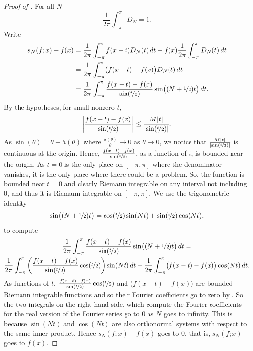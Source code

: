 \begin{proof}[Proof of ]
For all $N$,
\begin{equation*}
\frac{1}{2\pi} \int_{-\pi}^\pi D_N = 1 .
\end{equation*}
Write
\begin{equation*}
\begin{split}
s_N(f;x)-f(x) & =
\frac{1}{2\pi} \int_{-\pi}^\pi f(x-t) D_N(t) \, dt 
-
f(x)
\frac{1}{2\pi} \int_{-\pi}^\pi D_N(t) \, dt
\\
& = 
\frac{1}{2\pi} \int_{-\pi}^\pi \bigl( f(x-t) - f(x) \bigr) D_N(t) \, dt 
\\
& = 
\frac{1}{2\pi} \int_{-\pi}^\pi \frac{f(x-t) - f(x)}{\sin(\nicefrac{t}{2})} \sin\bigl(
(N+\nicefrac{1}{2})t \bigr) \, dt .
\end{split}
\end{equation*}
By the hypotheses,
for small nonzero $t$,
\begin{equation*}
\left\lvert { \frac{f(x-t) - f(x)}{\sin(\nicefrac{t}{2})} } \right\rvert
\leq
\frac{M\lvert {t} \rvert}{\lvert {\sin(\nicefrac{t}{2})} \rvert} .
\end{equation*}
As $\sin(\theta) = \theta + h(\theta)$ where $\frac{h(\theta)}{\theta} \to
0$ as $\theta \to 0$,
we notice that
$\frac{M\lvert {t} \rvert}{\lvert {\sin(\nicefrac{t}{2})} \rvert}$ is continuous at the
origin.
Hence,
$\frac{f(x-t) - f(x)}{\sin(\nicefrac{t}{2})}$, as a function of $t$,
is bounded near the origin.
As $t=0$ is the only place on $[-\pi,\pi]$ where the denominator vanishes,
it is the only place where there could be a problem.
So, the function is bounded near $t=0$ and clearly
Riemann integrable on any interval not including $0$, and thus
it is Riemann integrable on $[-\pi,\pi]$.
We use the trigonometric identity
\begin{equation*}
\sin\bigl( (N+\nicefrac{1}{2})t \bigr)
=
\cos(\nicefrac{t}{2}) \sin(Nt) + 
\sin(\nicefrac{t}{2}) \cos(Nt) ,
\end{equation*}
to compute
\begin{multline*}
\frac{1}{2\pi} \int_{-\pi}^\pi \frac{f(x-t) - f(x)}{\sin(\nicefrac{t}{2})} \sin\bigl(
(N+\nicefrac{1}{2})t \bigr) \, dt 
= \\
\frac{1}{2\pi} \int_{-\pi}^\pi
\left( \frac{f(x-t) - f(x)}{\sin(\nicefrac{t}{2})}
\cos (\nicefrac{t}{2}) \right) \sin (Nt) \, dt
+
\frac{1}{2\pi} \int_{-\pi}^\pi \bigl( f(x-t) - f(x) \bigr)
\cos (Nt) \, dt .
\end{multline*}
As functions of $t$, 
$\frac{f(x-t) - f(x)}{\sin(\nicefrac{t}{2})} \cos (\nicefrac{t}{2})$
and
$\bigl( f(x-t) - f(x) \bigr)$ are bounded Riemann integrable functions
and so their Fourier coefficients go to zero by .  So the two
integrals on the right-hand side, which compute the Fourier coefficients
for the real version of the Fourier series go to 0 as $N$ goes to infinity.
This is because $\sin(Nt)$ and $\cos(Nt)$ are also orthonormal systems
with respect to the same inner product.
Hence $s_N(f;x)-f(x)$ goes to 0, that is, $s_N(f;x)$ goes to $f(x)$.
\end{proof}

